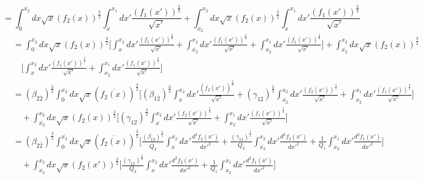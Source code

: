 \documentclass[fleqn, 10pt]{article}
\begin{document}
            \begin{equation*}
            = \int^{\overline{x_2}}_0 dx \sqrt{x} (f_2(x))^\frac{3}{2} \int^{x_1}_{x} dx' \frac{(f_1(x'))^\frac{3}{2}}{\sqrt{x'}} + \int^{x_2}_{\overline{x_2}} dx \sqrt{x} (f_2(x))^\frac{3}{2} \int^{x_1}_{x} dx' \frac{(f_1(x'))^\frac{3}{2}}{\sqrt{x'}}
            \end{equation*}
            \begin{equation*}
             \begin{split}
                                &= \int^{\overline{x_2}}_0 dx \sqrt{x} (f_2(x))^\frac{3}{2} \Biggl[ \int^{\overline{x_2}}_{x} dx' \frac{(f_1(x'))^\frac{3}{2}}{\sqrt{x'}} + \int^{x_2}_{\overline{x_2}} dx' \frac{(f_1(x'))^\frac{3}{2}}{\sqrt{x'}} + \int^{x_1}_{x_2} dx' \frac{(f_1(x'))^\frac{3}{2}}{\sqrt{x'}} \Biggr] + \int^{x_2}_{\overline{x_2}} dx \sqrt{x} (f_2(x))^\frac{3}{2} \\ & \quad \Biggl[ \int^{x_2}_{x} dx' \frac{(f_1(x'))^\frac{3}{2}}{\sqrt{x'}}  + \int^{x_1}_{x_2} dx' \frac{(f_1(x'))^\frac{3}{2}}{\sqrt{x'}} \Biggr]
                                \end{split}
                            \end{equation*}
                            \begin{equation*}
                            \begin{split}
                                &= (\beta_{2\overline{2}})^\frac{3}{2} \int^{\overline{x_2}}_0 dx \sqrt{x} (\overline{f_2(x)})^\frac{3}{2} \Biggl[ (\beta_{1\overline{2}})^\frac{3}{2} \int^{\overline{x_2}}_{x} dx' \frac{(\overline{f_2(x')})^\frac{3}{2}}{\sqrt{x'}} + (\gamma_{12})^\frac{3}{2} \int^{x_2}_{\overline{x_2}} dx' \frac{(f_2(x'))^\frac{3}{2}}{\sqrt{x'}} + \int^{x_1}_{x_2} dx' \frac{(f_1(x'))^\frac{3}{2}}{\sqrt{x'}} \Biggr] \\ & \quad + \int^{x_2}_{\overline{x_2}} dx \sqrt{x} (f_2(x))^\frac{3}{2}  \Biggl[ (\gamma_{12})^\frac{3}{2} \int^{x_2}_{x} dx' \frac{(f_2(x'))^\frac{3}{2}}{\sqrt{x'}} + \int^{x_1}_{x_2} dx' \frac{(f_1(x'))^\frac{3}{2}}{\sqrt{x'}} \Biggr]
                                \end{split}
                            \end{equation*}
                            \begin{equation*}
                            \begin{split}
                                &= (\beta_{2\overline{2}})^\frac{3}{2} \int^{\overline{x_2}}_0 dx \sqrt{x} (\overline{f_2(x)})^\frac{3}{2} \Biggl[\frac{(\beta_{1\overline{2}})^\frac{3}{2}}{\overline{Q_2}} \int^{\overline{x_2}}_{x} dx' \frac{d^2\overline{f_2(x')}}{dx'^2} + \frac{(\gamma_{12})^\frac{3}{2}}{Q_2} \int^{x_2}_{\overline{x_2}} dx' \frac{d^2f_2(x')}{dx'^2} + \frac{1}{Q_1} \int^{x_1}_{x_2} dx' \frac{d^2f_1(x')}{dx'^2} \Biggr] \\ & \quad + \int^{x_2}_{\overline{x_2}} dx \sqrt{x} (f_2(x'))^\frac{3}{2} \Biggl[ \frac{(\gamma_{12})^\frac{3}{2}}{Q_2} \int^{x_2}_{x} dx' \frac{d^2f_2(x')}{dx'^2} + \frac{1}{Q_1} \int^{x_1}_{x_2} dx' \frac{d^2f_1(x')}{dx'^2} \biggr] 
                                \end{split}
                            \end{equation*}
\end{document}
